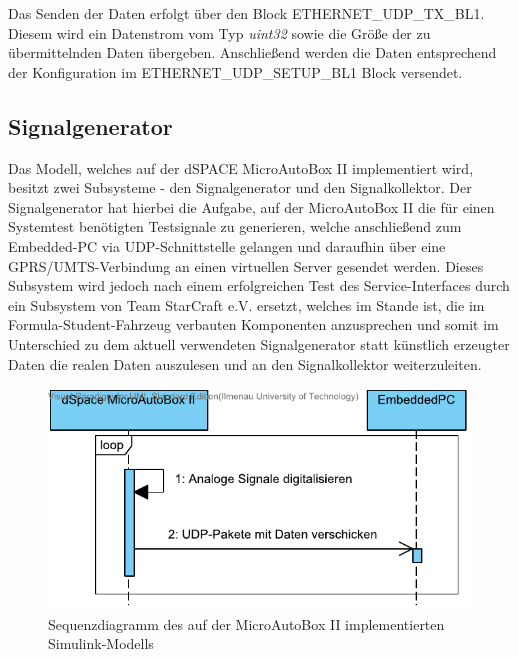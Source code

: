 \documentclass[fontsize = 12pt, paper = a4]{scrreprt}
\begin{document}
\begin{itemize}
Das Senden der Daten erfolgt über den Block ETHERNET\_UDP\_TX\_BL1.\\ Diesem wird ein Datenstrom vom Typ \textit{uint32} sowie die Größe der zu übermittelnden Daten übergeben. Anschließend werden die Daten entsprechend der Konfiguration im ETHERNET\_UDP\_SETUP\_BL1 Block versendet.

\end{itemize}

\subsection{Signalgenerator}

Das Modell, welches auf der dSPACE MicroAutoBox II implementiert wird, besitzt zwei Subsysteme - den Signalgenerator und den Signalkollektor. Der Signalgenerator hat hierbei die Aufgabe, auf der MicroAutoBox II die für einen Systemtest benötigten Testsignale zu generieren, welche anschließend zum Embedded-PC via UDP-Schnittstelle gelangen und daraufhin über eine GPRS/UMTS-Verbindung an einen virtuellen Server gesendet werden. Dieses Subsystem wird jedoch nach einem erfolgreichen Test des Service-Interfaces durch ein Subsystem von Team StarCraft e.V. ersetzt, welches im Stande ist, die im Formula-Student-Fahrzeug verbauten Komponenten anzusprechen und somit im Unterschied zu dem aktuell verwendeten Signalgenerator statt künstlich erzeugter Daten die realen Daten auszulesen und an den Signalkollektor weiterzuleiten. \vspace*{5mm}

\begin{figure}[h]
\centering
\includegraphics[scale = 1]{opt_autobox}
\caption[Sequenzdiagramm Simulink-Modell]
{Sequenzdiagramm des auf der MicroAutoBox II implementierten Simulink-Modells}
\end{figure}
\end{document}
